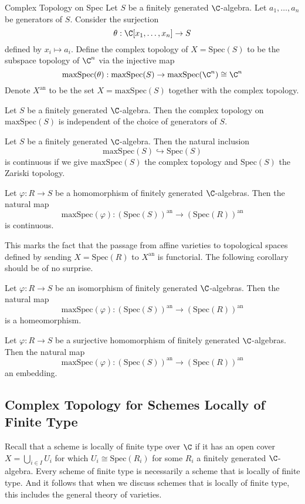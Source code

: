 \documentclass[a4paper]{article}
\begin{document}
\begin{defn}{Complex Topology on Spec}{} Let $S$ be a finitely generated $\C$-algebra. Let $a_1,\dots,a_n$ be generators of $S$. Consider the surjection $$\theta:\C[x_1,\dots,x_n]\to S$$ defined by $x_i\mapsto a_i$. Define the complex topology of $X=\text{Spec}(S)$ to be the subspace topology of $\C^n$ via the injective map $$\text{maxSpec}(\theta):\text{maxSpec}(S)\to\text{maxSpec}(\C^n)\cong\C^n$$ Denote $X^\text{an}$ to be the set $X=\text{maxSpec}(S)$ together with the complex topology. 
\end{defn}

\begin{lmm}{}{} Let $S$ be a finitely generated $\C$-algebra. Then the complex topology on $\text{maxSpec}(S)$ is independent of the choice of generators of $S$. 
\end{lmm}

\begin{prp}{}{} Let $S$ be a finitely generated $\C$-algebra. Then the natural inclusion $$\text{maxSpec}(S)\hookrightarrow\text{Spec}(S)$$ is continuous if we give $\text{maxSpec}(S)$ the complex topology and $\text{Spec}(S)$ the Zariski topology. 
\end{prp}

\begin{prp}{}{} Let $\varphi:R\to S$ be a homomorphism of finitely generated $\C$-algebras. Then the natural map $$\text{maxSpec}(\varphi):(\text{Spec}(S))^\text{an}\to(\text{Spec}(R))^\text{an}$$ is continuous.
\end{prp}

This marks the fact that the passage from affine varieties to topological spaces defined by sending $X=\text{Spec}(R)$ to $X^\text{an}$ is functorial. The following corollary should be of no surprise. 

\begin{crl}{}{} Let $\varphi:R\to S$ be an isomorphism of finitely generated $\C$-algebras. Then the natural map $$\text{maxSpec}(\varphi):(\text{Spec}(S))^\text{an}\to(\text{Spec}(R))^\text{an}$$ is a homeomorphism. 
\end{crl}

\begin{lmm}{}{} Let $\varphi:R\to S$ be a surjective homomorphism of finitely generated $\C$-algebras. Then the natural map $$\text{maxSpec}(\varphi):(\text{Spec}(S))^\text{an}\to(\text{Spec}(R))^\text{an}$$ an embedding. 
\end{lmm}

\subsection{Complex Topology for Schemes Locally of Finite Type}
Recall that a scheme is locally of finite type over $\C$ if it has an open cover $X=\bigcup_{i\in I}U_i$ for which $U_i\cong\text{Spec}(R_i)$ for some $R_i$ a finitely generated $\C$-algebra. Every scheme of finite type is necessarily a scheme that is locally of finite type. And it follows that when we discuss schemes that is locally of finite type, this includes the general theory of varieties. 
\end{document}
